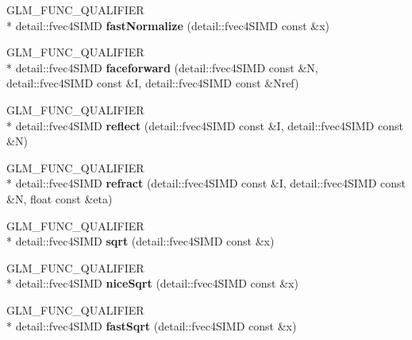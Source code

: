 \begin{DoxyCompactItemize}
\item 
\hypertarget{namespaceglm_a28640ee202fdb12ef3e836c257675043}{G\-L\-M\-\_\-\-F\-U\-N\-C\-\_\-\-Q\-U\-A\-L\-I\-F\-I\-E\-R \\*
detail\-::fvec4\-S\-I\-M\-D {\bfseries fast\-Normalize} (detail\-::fvec4\-S\-I\-M\-D const \&x)}\label{namespaceglm_a28640ee202fdb12ef3e836c257675043}

\item 
\hypertarget{namespaceglm_ae3d9637fb22cf7eecd448c5ad341efab}{G\-L\-M\-\_\-\-F\-U\-N\-C\-\_\-\-Q\-U\-A\-L\-I\-F\-I\-E\-R \\*
detail\-::fvec4\-S\-I\-M\-D {\bfseries faceforward} (detail\-::fvec4\-S\-I\-M\-D const \&N, detail\-::fvec4\-S\-I\-M\-D const \&I, detail\-::fvec4\-S\-I\-M\-D const \&Nref)}\label{namespaceglm_ae3d9637fb22cf7eecd448c5ad341efab}

\item 
\hypertarget{namespaceglm_aca05cfddf931415f023b4ac91b96d739}{G\-L\-M\-\_\-\-F\-U\-N\-C\-\_\-\-Q\-U\-A\-L\-I\-F\-I\-E\-R \\*
detail\-::fvec4\-S\-I\-M\-D {\bfseries reflect} (detail\-::fvec4\-S\-I\-M\-D const \&I, detail\-::fvec4\-S\-I\-M\-D const \&N)}\label{namespaceglm_aca05cfddf931415f023b4ac91b96d739}

\item 
\hypertarget{namespaceglm_a6b7db0c107279793b77576c2eef680b3}{G\-L\-M\-\_\-\-F\-U\-N\-C\-\_\-\-Q\-U\-A\-L\-I\-F\-I\-E\-R \\*
detail\-::fvec4\-S\-I\-M\-D {\bfseries refract} (detail\-::fvec4\-S\-I\-M\-D const \&I, detail\-::fvec4\-S\-I\-M\-D const \&N, float const \&eta)}\label{namespaceglm_a6b7db0c107279793b77576c2eef680b3}

\item 
\hypertarget{namespaceglm_a0af4fc25d7a64d4947598f48a0229375}{G\-L\-M\-\_\-\-F\-U\-N\-C\-\_\-\-Q\-U\-A\-L\-I\-F\-I\-E\-R \\*
detail\-::fvec4\-S\-I\-M\-D {\bfseries sqrt} (detail\-::fvec4\-S\-I\-M\-D const \&x)}\label{namespaceglm_a0af4fc25d7a64d4947598f48a0229375}

\item 
\hypertarget{namespaceglm_a4b8b68e979fc5b12aba9290beb8dfb30}{G\-L\-M\-\_\-\-F\-U\-N\-C\-\_\-\-Q\-U\-A\-L\-I\-F\-I\-E\-R \\*
detail\-::fvec4\-S\-I\-M\-D {\bfseries nice\-Sqrt} (detail\-::fvec4\-S\-I\-M\-D const \&x)}\label{namespaceglm_a4b8b68e979fc5b12aba9290beb8dfb30}

\item 
\hypertarget{namespaceglm_a668307d251c9bc5a349ab3d2d83095d4}{G\-L\-M\-\_\-\-F\-U\-N\-C\-\_\-\-Q\-U\-A\-L\-I\-F\-I\-E\-R \\*
detail\-::fvec4\-S\-I\-M\-D {\bfseries fast\-Sqrt} (detail\-::fvec4\-S\-I\-M\-D const \&x)}\label{namespaceglm_a668307d251c9bc5a349ab3d2d83095d4}


\end{DoxyCompactItemize}
